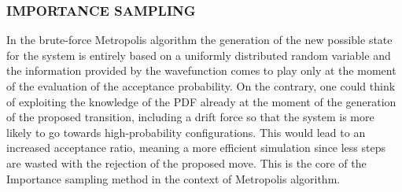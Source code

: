 \subsubsection{IMPORTANCE SAMPLING}
In the brute-force Metropolis algorithm the generation of the new possible state for the system is entirely based on a uniformly distributed random variable and the information provided by the wavefunction comes to play only at the moment of the evaluation of the acceptance probability. On the contrary, one could think of exploiting the knowledge of the PDF already at the moment of the generation of the proposed transition, including a drift force so that the system is more likely to go towards high-probability configurations. This would lead to an increased acceptance ratio, meaning a more efficient simulation since less steps are wasted with the rejection of the proposed move. This is the core of the Importance sampling method \cite{hastings} in the context of Metropolis algorithm.

